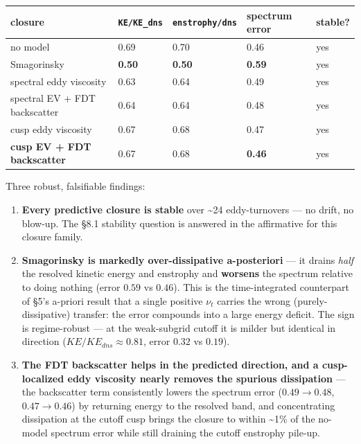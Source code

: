 \documentclass[aps,prfluids,preprint,superscriptaddress,nofootinbib]{revtex4-2}
\newcommand{\code}[1]{\texttt{#1}}
\begin{document}
\begin{center}\small
\begin{tabular}{lllll}
\toprule
closure & \code{KE/\allowbreak{}KE\_\allowbreak{}dns} & \code{enstrophy/\allowbreak{}dns} & spectrum error & stable? \\
\midrule
no model & 0.69 & 0.70 & 0.46 & yes \\
Smagorinsky & \textbf{0.50} & \textbf{0.50} & \textbf{0.59} & yes \\
spectral eddy viscosity & 0.63 & 0.64 & 0.49 & yes \\
spectral EV + FDT backscatter & 0.64 & 0.64 & 0.48 & yes \\
cusp eddy viscosity & 0.67 & 0.68 & 0.47 & yes \\
\textbf{cusp EV + FDT backscatter} & 0.67 & 0.68 & \textbf{0.46} & yes \\
\bottomrule
\end{tabular}
\end{center}

Three robust, falsifiable findings:

\begin{enumerate}
\item \textbf{Every predictive closure is stable} over \textasciitilde{}24 eddy-turnovers — no drift, no blow-up. The §8.1 stability question is answered in the affirmative for this closure family.
\item \textbf{Smagorinsky is markedly over-dissipative a-posteriori} — it drains \emph{half} the resolved kinetic energy and enstrophy and \textbf{worsens} the spectrum relative to doing nothing (error $0.59$ vs $0.46$). This is the time-integrated counterpart of §5's a-priori result that a single positive $\nu _{t}$ carries the wrong (purely-dissipative) transfer: the error compounds into a large energy deficit. The sign is regime-robust — at the weak-subgrid cutoff it is milder but identical in direction ($KE/KE_{dns}\approx 0.81$, error $0.32$ vs $0.19$).
\item \textbf{The FDT backscatter helps in the predicted direction, and a cusp-localized eddy viscosity nearly removes the spurious dissipation} — the backscatter term consistently lowers the spectrum error ($0.49\to 0.48$, $0.47\to 0.46$) by returning energy to the resolved band, and concentrating dissipation at the cutoff cusp brings the closure to within \textasciitilde{}1\% of the no-model spectrum error while still draining the cutoff enstrophy pile-up.
\end{enumerate}
\end{document}
